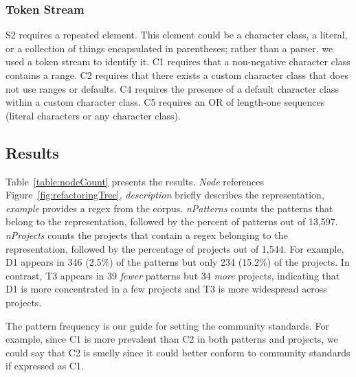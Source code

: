 \subsubsection{Token Stream}
S2 requires a repeated element. This element could be a character class, a literal, or a collection of things encapsulated in parentheses; rather than a parser, we used a token stream to identify it.
C1 requires that a non-negative character class contains a range.
C2 requires that there exists a custom character class that does not use ranges or defaults.
C4 requires the presence of a default character class within a custom character class.
C5 requires an OR of length-one sequences (literal characters or any character class).


\subsection{Results}
Table~\ref{table:nodeCount} presents the results.
 \emph{Node} references Figure~\ref{fig:refactoringTree}, \emph{description} briefly describes the representation, \emph{example} provides a regex from the corpus. \emph{nPatterns} counts the patterns that belong to the representation, followed by the percent of patterns out of 13,597.
 \emph{nProjects} counts the projects that contain a regex belonging to the representation,
followed by the percentage of projects out of 1,544.
For example, D1 appears in 346 (2.5\%) of the patterns but only 234 (15.2\%) of the projects.
 In contrast, T3 appears in 39 \emph{fewer} patterns but 34 \emph{more} projects, indicating that D1 is more concentrated in a few projects and T3 is more widespread across projects.

The pattern frequency is our guide for setting the community standards.
For example, since C1 is more prevalent than C2 in both patterns and projects, we could say that C2 is smelly since it could better conform to community standards if expressed as C1.

